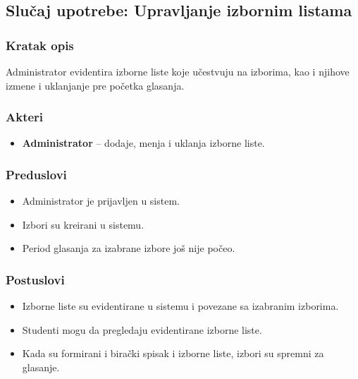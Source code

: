 \subsection{Slučaj upotrebe: Upravljanje izbornim listama}

\subsubsection*{Kratak opis}
Administrator evidentira izborne liste koje učestvuju na izborima, kao i njihove izmene i uklanjanje pre početka glasanja.

\subsubsection*{Akteri}
\begin{itemize}
    \item \textbf{Administrator} -- dodaje, menja i uklanja izborne liste.
\end{itemize}

\subsubsection*{Preduslovi}
\begin{itemize}
    \item Administrator je prijavljen u sistem.
    \item Izbori su kreirani u sistemu.
    \item Period glasanja za izabrane izbore još nije počeo.
\end{itemize}

\subsubsection*{Postuslovi}
\begin{itemize}
    \item Izborne liste su evidentirane u sistemu i povezane sa izabranim izborima.
    \item Studenti mogu da pregledaju evidentirane izborne liste.
    \item Kada su formirani i birački spisak i izborne liste, izbori su spremni za glasanje.
\end{itemize}

